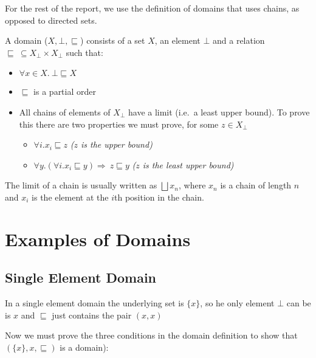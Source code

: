 For the rest of the report, we use the definition of domains that uses chains, as opposed to directed sets.
\vspace{0.5cm}
\begin{defn}
A domain ($X, \bot, \sqsubseteq$) consists of a set $X$, an element $\bot$ and a relation $\sqsubseteq \ \subseteq X_\bot \times X_\bot$ such that:

\begin{itemize}
\item{$\forall x \in X. \ \bot \sqsubseteq X$}
\item{$\sqsubseteq$ is a partial order}
\item{All chains of elements of $X_\bot$ have a limit (i.e.\ a least upper bound). To prove this there are two properties we must prove, for some $z \in X_\bot$}
\begin{itemize}
 \item{$\forall i. x_i \sqsubseteq z$ \hspace{1cm} \emph{($z$ is the upper bound)}}
 \item{$\forall y. (\forall i.x_i  \sqsubseteq y) \Rightarrow \ z \sqsubseteq y$ \hspace{0.25cm} \emph{($z$ is the least upper bound)}}
\end{itemize}
\end{itemize}

The limit of a chain is usually written as $\bigsqcup x_n$, where $x_n$ is a chain of length $n$ and $x_i$ is the element at the $i$th position in the chain.

\end{defn} 

\section{Examples of Domains}\label{ex}
\subsection{Single Element Domain}\label{single}
In a single element domain the underlying set is $\{x\}$, so he only element $\bot$ can be is $x$ and $\sqsubseteq$ just contains the pair $(x,x)$

Now we must prove the three conditions in the domain definition to show that $(\{x\},x,\sqsubseteq)$ is a domain):

